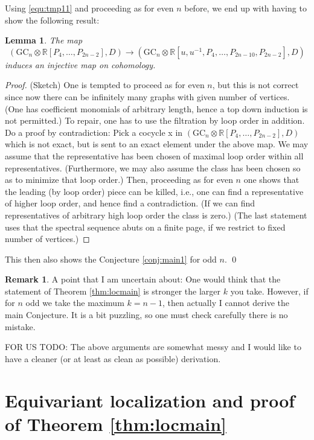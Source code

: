 \documentclass[a4paper]{amsart}
\theoremstyle{plain}
\newtheorem{lemma}[thm]{Lemma}
\theoremstyle{definition}
\newtheorem{rem}{Remark}
\newcommand{\R}{{\mathbb{R}}}
\newcommand{\FM}{\mathsf{FM}}
\newcommand{\GC}{\mathrm{GC}}
\begin{document}
Using \eqref{equ:tmp11} and proceeding as for even $n$ before, we end up with having to show the following result:
\begin{lemma} 
The map 
\[
(\GC_n \otimes \R[P_4,\dots,P_{2n-2}], D)
\to 
(\GC_n \otimes \R[u,u^{-1}, P_4,\dots,P_{2n-10},P_{2n-2}], D)
\]
induces an injective map on cohomology. 
\end{lemma}

\begin{proof} (Sketch)
One is tempted to proceed as for even $n$, but this is not correct since now there can be infinitely many graphs with given number of vertices. (One has coefficient monomials of arbitrary length, hence a top down induction is not permitted.)
To repair, one has to use the filtration by loop order in addition.
Do a proof by contradiction: Pick a cocycle x in $(\GC_n \otimes \R[P_4,\dots,P_{2n-2}], D)
$ which is not exact, but is sent to an exact element under the above map.
We may assume that the representative has been chosen of maximal loop order within all representatives.
(Furthermore, we may also assume the class has been chosen so as to minimize that loop order.)
Then, proceeding as for even $n$ one shows that the leading (by loop order) piece can be killed, i.e., one can find a representative of higher loop order, and hence find a contradiction.
(If we can find representatives of arbitrary high loop order the class is zero.)
(The last statement uses that the spectral sequence abuts on a finite page, if we restrict to fixed number of vertices.)
\end{proof}

This then also shows the Conjecture \ref{conj:main1} for odd $n$.
\hfill\qed


\begin{rem}
A point that I am uncertain about: One would think that the statement of Theorem \ref{thm:locmain} is stronger the larger $k$ you take.
However, if for $n$ odd we take the maximum $k=n-1$, then actually I cannot derive the main Conjecture.
It is a bit puzzling, so one must check carefully there is no mistake.
\end{rem}

FOR US TODO: The above arguments are somewhat messy and I would like to have a cleaner (or at least as clean as possible) derivation.

\newcommand{\hFM}{\widehat{\FM}}


\section{Equivariant localization and proof of Theorem \ref{thm:locmain}}
\end{document}
